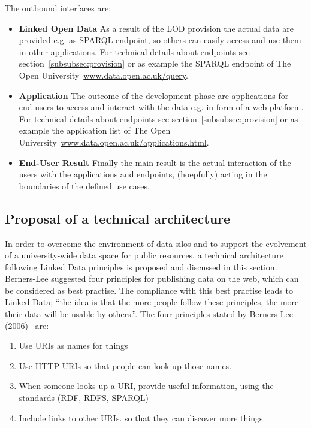The outbound interfaces are:

\begin{itemize}
	\item \textbf{Linked Open Data}\newline
	As a result of the LOD provision the actual data are provided e.g. as SPARQL endpoint, so others can easily access and use them in other applications. For technical details about endpoints see section~\ref{subsubsec:provision} or as example the SPARQL endpoint of The Open University~\url{www.data.open.ac.uk/query}.
	\item \textbf{Application}\newline
	The outcome of the development phase are applications for end-users to access and interact with the data e.g. in form of a web platform. For technical details about endpoints see section~\ref{subsubsec:provision} or as example the application list of The Open University~\url{www.data.open.ac.uk/applications.html}.
	\item \textbf{End-User Result}\newline
	Finally the main result is the actual interaction of the users with the applications and endpoints, (hoepfully) acting in the boundaries of the defined use cases.
\end{itemize}

\newpage

\subsection{Proposal of a technical architecture}

In order to overcome the environment of data silos and to support the evolvement of a university-wide data space for public resources, a technical architecture following Linked Data principles is proposed and discussed in this section. Berners-Lee suggested four principles for publishing data on the web, which can be considered as best practise. The compliance with this best practise leads to Linked Data; \enquote{the idea is that the more people follow these principles, the more their data will be usable by others.}\cite{simperl_using_2013}. The four principles stated by Berners-Lee (2006)~\cite{berners-lee_linked_2006} are:
\begin{enumerate}
	\item Use URIs as names for things
	\item Use HTTP URIs so that people can look up those names.
	\item When someone looks up a URI, provide useful information, using the standards (RDF, RDFS, SPARQL)
	\item Include links to other URIs. so that they can discover more things.
\end{enumerate}

